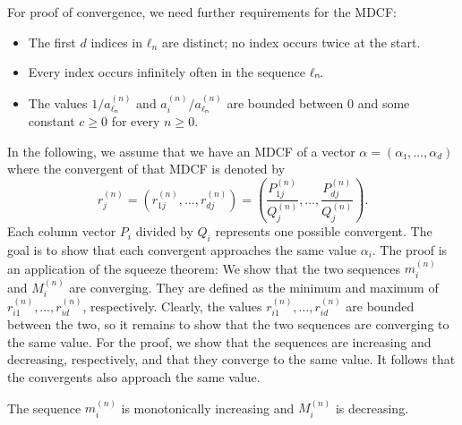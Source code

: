 For proof of convergence, we need further requirements for the MDCF:
\begin{itemize}
  \item The first $d$ indices in $ℓ_n$ are distinct; no index occurs twice at the start.
  \item Every index occurs infinitely often in the sequence $ℓₙ$.
  \item The values $1/a_{ℓₙ}^{(n)}$ and $a_i^{(n)}/a_{ℓₙ}^{(n)}$ are bounded
    between $0$ and some constant $c ≥ 0$ for every $n ≥ 0$.
\end{itemize}
In the following, we assume that we have an MDCF of a vector $α = (α₁, …, α_d)$
where the convergent of that MDCF is denoted by
\[
  r_j^{(n)} = (r_{1j}^{(n)}, …, r_{dj}^{(n)}) = \left(  \frac{P_{1j}^{(n)}}{Q_j^{(n)}}, \dots, \frac{P_{dj}^{(n)}}{Q_j^{(n)}} \right).
\]
Each column vector $P_i$ divided by $Q_i$ represents one possible convergent.
The goal is to show that each convergent approaches the same value $α_i$.
The proof is an application of the squeeze theorem:
We show that the two sequences $m_i^{(n)}$ and $M_i^{(n)}$ are converging.
They are defined as the minimum and maximum of $r_{i1}^{(n)}, …, r_{id}^{(n)}$, respectively.
Clearly, the values $r_{i1}^{(n)}, …, r_{id}^{(n)}$ are bounded between the two,
so it remains to show that the two sequences are converging to the same value.
For the proof, we show that the sequences are increasing and decreasing, respectively,
and that they converge to the same value.
It follows that the convergents also approach the same value.

\begin{lemma}
  The sequence $m_i^{(n)}$ is monotonically increasing and $M_i^{(n)}$ is decreasing.
\end{lemma}

